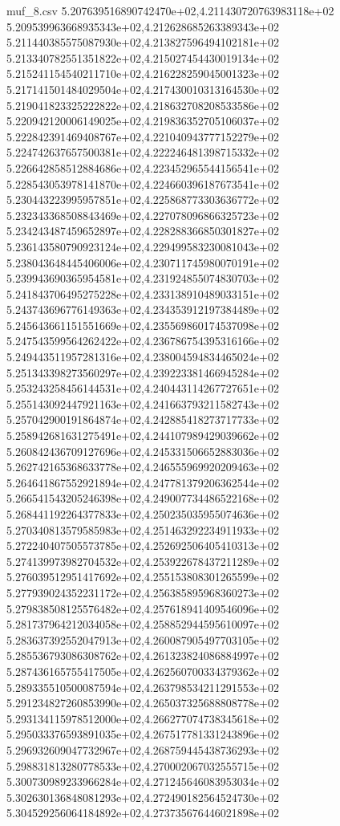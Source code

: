 \begin{filecontents*}{muf_8.csv}
5.207639516890742470e+02,4.211430720763983118e+02
5.209539963668935343e+02,4.212628685263389343e+02
5.211440385575087930e+02,4.213827596494102181e+02
5.213340782551351822e+02,4.215027454430019134e+02
5.215241154540211710e+02,4.216228259045001323e+02
5.217141501484029504e+02,4.217430010313164530e+02
5.219041823325222822e+02,4.218632708208533586e+02
5.220942120006149025e+02,4.219836352705106037e+02
5.222842391469408767e+02,4.221040943777152279e+02
5.224742637657500381e+02,4.222246481398715332e+02
5.226642858512884686e+02,4.223452965544156541e+02
5.228543053978141870e+02,4.224660396187673541e+02
5.230443223995957851e+02,4.225868773303636772e+02
5.232343368508843469e+02,4.227078096866325723e+02
5.234243487459652897e+02,4.228288366850301827e+02
5.236143580790923124e+02,4.229499583230081043e+02
5.238043648445406006e+02,4.230711745980070191e+02
5.239943690365954581e+02,4.231924855074830703e+02
5.241843706495275228e+02,4.233138910489033151e+02
5.243743696776149363e+02,4.234353912197384489e+02
5.245643661151551669e+02,4.235569860174537098e+02
5.247543599564262422e+02,4.236786754395316166e+02
5.249443511957281316e+02,4.238004594834465024e+02
5.251343398273560297e+02,4.239223381466945284e+02
5.253243258456144531e+02,4.240443114267727651e+02
5.255143092447921163e+02,4.241663793211582743e+02
5.257042900191864874e+02,4.242885418273717733e+02
5.258942681631275491e+02,4.244107989429039662e+02
5.260842436709127696e+02,4.245331506652883036e+02
5.262742165368633778e+02,4.246555969920209463e+02
5.264641867552921894e+02,4.247781379206362544e+02
5.266541543205246398e+02,4.249007734486522168e+02
5.268441192264377833e+02,4.250235035955074636e+02
5.270340813579585983e+02,4.251463292234911933e+02
5.272240407505573785e+02,4.252692506405410313e+02
5.274139973982704532e+02,4.253922678437211289e+02
5.276039512951417692e+02,4.255153808301265599e+02
5.277939024352231172e+02,4.256385895968360273e+02
5.279838508125576482e+02,4.257618941409546096e+02
5.281737964212034058e+02,4.258852944595610097e+02
5.283637392552047913e+02,4.260087905497703105e+02
5.285536793086308762e+02,4.261323824086884997e+02
5.287436165755417505e+02,4.262560700334379362e+02
5.289335510500087594e+02,4.263798534211291553e+02
5.291234827260853990e+02,4.265037325688808778e+02
5.293134115978512000e+02,4.266277074738345618e+02
5.295033376593891035e+02,4.267517781331243896e+02
5.296932609047732967e+02,4.268759445438736293e+02
5.298831813280778533e+02,4.270002067032555715e+02
5.300730989233966284e+02,4.271245646083953034e+02
5.302630136848081293e+02,4.272490182564524730e+02
5.304529256064184892e+02,4.273735676446021898e+02

\end{filecontents*}
